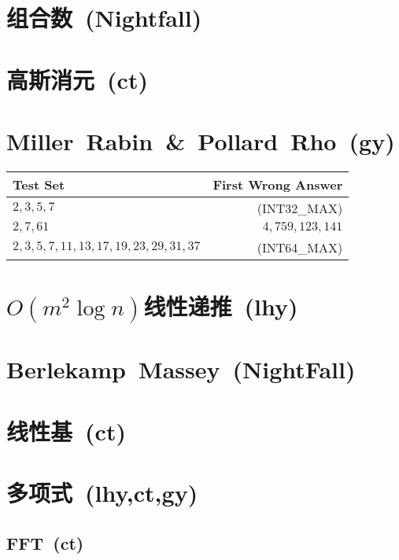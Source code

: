 \section{组合数~\small(Nightfall)}

\section{高斯消元~\small(ct)}

\section{Miller~Rabin~\&~Pollard~Rho~\small(gy)}
    \begin{tabular}{l r}
        \hline
        Test Set & First Wrong Answer\\\hline
        $ 2, 3, 5, 7 $ & (INT32\_MAX)\\\hline
        $ 2, 7, 61 $ & $ 4,759,123,141 $\\\hline
        $ 2, 3, 5, 7, 11, 13, 17, 19, 23, 29, 31, 37 $ & (INT64\_MAX)\\\hline
    \end{tabular}

\section{$ O(m ^ 2 \log n) $线性递推~\small(lhy)}

\section{Berlekamp~Massey~\small(NightFall)}

\section{线性基~\small(ct)}

\section{多项式~\small(lhy,ct,gy)}
    \subsection*{FFT~\small(ct)}
